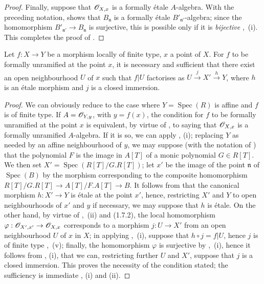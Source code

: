 \begin{proof}
Finally, suppose that $\mathscr{O}_{X,x}$ is a formally \'etale $A$-algebra.
With the preceding notation,  shows that $B_\mathfrak{n}$ is a formally \'etale $B'_{\mathfrak{n}'}$-algebra; since the homomorphism $B'_{\mathfrak{n}'}\to B_\mathfrak{n}$ is surjective, this is possible only if it is \emph{bijective} ,~(i).
This completes the proof of .
\end{proof}

\begin{corollary}[18.4.7]
\label{IV.18.4.7}
Let $f:X\to Y$ be a morphism locally of finite type, $x$ a point of $X$.
For $f$ to be formally unramified at the point $x$, it is necessary and sufficient that there exist an open neighbourhood $U$ of $x$ such that $f|U$ factorises as $U\xrightarrow{j}X'\xrightarrow{h}Y$, where $h$ is an \'etale morphism and $j$ is a closed immersion.
\end{corollary}

\begin{proof}
We can obviously reduce to the case where $Y=\operatorname{Spec}(R)$ is affine and $f$ is of finite type.
If $A=\mathscr{O}_{Y,y}$, with $y=f(x)$, the condition for $f$ to be formally unramified at the point $x$ is equivalent, by virtue of , to saying that $\mathscr{O}_{X,x}$ is a formally unramified $A$-algebra.
If it is so, we can apply , (i);
replacing $Y$ as needed by an affine neighbourhood of $y$, we may suppose (with the notation of ) that the polynomial $F$ is the image in $A[T]$ of a monic polynomial $G\in R[T]$.
We then set $X'=\operatorname{Spec}(R[T]/G.R[T])$;
let $x'$ be the image of the point $\mathfrak{n}$ of $\operatorname{Spec}(B)$ by the morphism corresponding to the composite homomorphism $R[T]/G.R[T]\to A[T]/F.A[T]\to B$.
It follows from  that the canonical morphism $h:X'\to Y$ is \'etale at the point $x'$, hence, restricting $X'$ and $Y$ to open neighbourhoods of $x'$ and $y$ if necessary, we may suppose that $h$ is \'etale.
On the other hand, by virtue of ,~(ii) and (1.7.2), the local homomorphism $\varphi:\mathscr{O}_{X',x'}\to\mathscr{O}_{X,x}$ corresponds to a morphism
$j:U\to X'$ from an open neighbourhood $U$ of $x$ in $X$;
in applying ,~(i), suppose that $h\circ j=f|U$, hence $j$ is of finite type ,~(v);
finally, the homomorphism $\varphi$ is surjective by ,~(i), hence it follows from , (i), that we can, restricting further $U$ and $X'$, suppose that $j$ is a closed immersion.
This proves the necessity of the condition stated;
the sufficiency is immediate , (i) and (ii).
\end{proof}

